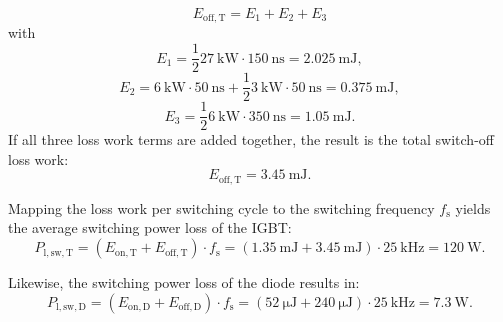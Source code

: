 \begin{solutionblock}
	\begin{equation}
		E_{\mathrm{off,T}} = E_{\mathrm{1}} + E_{\mathrm{2}} + E_{\mathrm{3}}
	\end{equation}
	with
	\begin{equation}
		E_{\mathrm{1}} = \frac{1}{2} \SI{27}{\kilo\watt} \cdot \SI{150}{\ns} = \SI {2.025}{\milli\joule},
	\end{equation}
	\begin{equation}
		E_{\mathrm{2}} = \SI{6}{\kilo\watt} \cdot \SI{50}{\ns} + \frac{1}{2} \SI{3}{\kilo\watt} \cdot \SI{50}{\ns} = \SI {0.375}{\milli\joule},
	\end{equation}
	\begin{equation}
		E_{\mathrm{3}} = \frac{1}{2} \SI{6}{\kilo\watt} \cdot \SI{350}{\ns} = \SI {1.05}{\milli\joule}.
	\end{equation}
	If all three loss work terms are added together, the result is the total switch-off loss work:
	\begin{equation}
		E_{\mathrm{off,T}} =  \SI {3.45}{\milli\joule}.
	\end{equation}

	

\end{solutionblock}

\begin{solutionblock}
	Mapping the loss work per switching cycle to the switching frequency $f_{\mathrm{s}}$ yields the average switching power loss of the IGBT:
	\begin{equation}
		P_{\mathrm{l,sw,T}} =  (E_{\mathrm{on,T}} +  E_{\mathrm{off,T}}) \cdot f_{\mathrm{s}} = (\SI {1.35}{\milli\joule} + \SI {3.45}{\milli\joule}) \cdot \SI {25}{\kilo\hertz} = \SI {120}{\watt}.
	\end{equation}

	Likewise, the switching power loss of the diode results in:
	\begin{equation}
		P_{\mathrm{l,sw,D}} =  (E_{\mathrm{on,D}} +  E_{\mathrm{off,D}}) \cdot f_{\mathrm{s}} = (\SI {52}{\micro\joule} + \SI {240}{\micro\joule}) \cdot \SI {25}{\kilo\hertz} = \SI {7.3}{\watt}.
	\end{equation}
\end{solutionblock}

